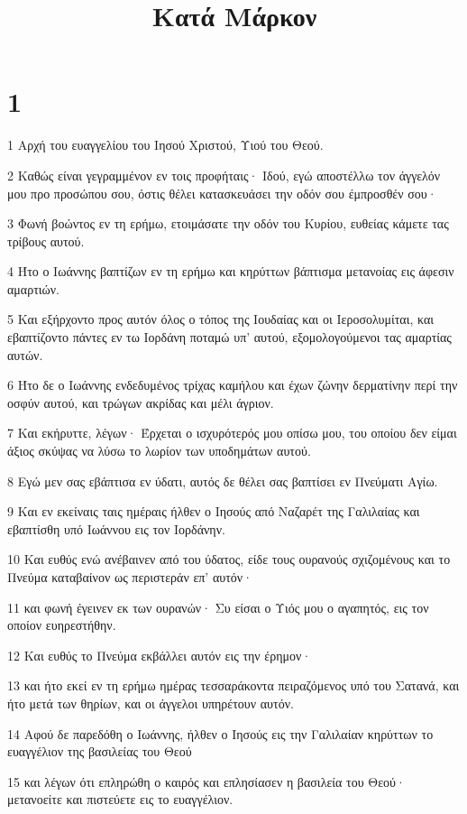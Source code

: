 

\title{Κατά Μάρκον}


\chapter{1}

\par 1 Αρχή του ευαγγελίου του Ιησού Χριστού, Υιού του Θεού.
\par 2 Καθώς είναι γεγραμμένον εν τοις προφήταις· Ιδού, εγώ αποστέλλω τον άγγελόν μου προ προσώπου σου, όστις θέλει κατασκευάσει την οδόν σου έμπροσθέν σου·
\par 3 Φωνή βοώντος εν τη ερήμω, ετοιμάσατε την οδόν του Κυρίου, ευθείας κάμετε τας τρίβους αυτού.
\par 4 Ήτο ο Ιωάννης βαπτίζων εν τη ερήμω και κηρύττων βάπτισμα μετανοίας εις άφεσιν αμαρτιών.
\par 5 Και εξήρχοντο προς αυτόν όλος ο τόπος της Ιουδαίας και οι Ιεροσολυμίται, και εβαπτίζοντο πάντες εν τω Ιορδάνη ποταμώ υπ' αυτού, εξομολογούμενοι τας αμαρτίας αυτών.
\par 6 Ήτο δε ο Ιωάννης ενδεδυμένος τρίχας καμήλου και έχων ζώνην δερματίνην περί την οσφύν αυτού, και τρώγων ακρίδας και μέλι άγριον.
\par 7 Και εκήρυττε, λέγων· Έρχεται ο ισχυρότερός μου οπίσω μου, του οποίου δεν είμαι άξιος σκύψας να λύσω το λωρίον των υποδημάτων αυτού.
\par 8 Εγώ μεν σας εβάπτισα εν ύδατι, αυτός δε θέλει σας βαπτίσει εν Πνεύματι Αγίω.
\par 9 Και εν εκείναις ταις ημέραις ήλθεν ο Ιησούς από Ναζαρέτ της Γαλιλαίας και εβαπτίσθη υπό Ιωάννου εις τον Ιορδάνην.
\par 10 Και ευθύς ενώ ανέβαινεν από του ύδατος, είδε τους ουρανούς σχιζομένους και το Πνεύμα καταβαίνον ως περιστεράν επ' αυτόν·
\par 11 και φωνή έγεινεν εκ των ουρανών· Συ είσαι ο Υιός μου ο αγαπητός, εις τον οποίον ευηρεστήθην.
\par 12 Και ευθύς το Πνεύμα εκβάλλει αυτόν εις την έρημον·
\par 13 και ήτο εκεί εν τη ερήμω ημέρας τεσσαράκοντα πειραζόμενος υπό του Σατανά, και ήτο μετά των θηρίων, και οι άγγελοι υπηρέτουν αυτόν.
\par 14 Αφού δε παρεδόθη ο Ιωάννης, ήλθεν ο Ιησούς εις την Γαλιλαίαν κηρύττων το ευαγγέλιον της βασιλείας του Θεού
\par 15 και λέγων ότι επληρώθη ο καιρός και επλησίασεν η βασιλεία του Θεού· μετανοείτε και πιστεύετε εις το ευαγγέλιον.
